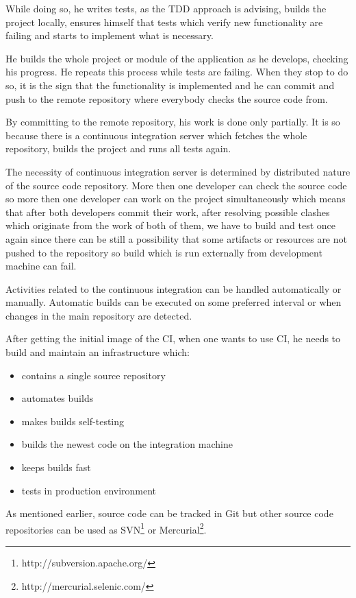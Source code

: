 \documentclass[12pt,final,oneside]{fithesis}
\begin{document}
While doing so, he writes tests, as the TDD approach is advising, builds the project locally, ensures himself that tests which verify new functionality are failing and starts to implement what is necessary.

He builds the whole project or module of the application as he develops, checking his progress. He repeats this process while tests are failing. When they stop to do so, it is the sign that the functionality is implemented and he can commit and push to the remote repository where everybody checks the source code from.

By committing to the remote repository, his work is done only partially. It is so because there is a continuous integration server which fetches the whole repository, builds the project and runs all tests again.

The necessity of continuous integration server is determined by distributed nature of the source code repository. More then one developer can check the source code so more then one developer can work on the project simultaneously which means that after both developers commit their work, after resolving possible clashes which originate from the work of both of them, we have to build and test once again since there can be still a possibility that some artifacts or resources are not pushed to the repository so build which is run externally from development machine can fail.

Activities related to the continuous integration can be handled automatically or manually. Automatic builds can be executed on some preferred interval or when changes in the main repository are detected.

After getting the initial image of the CI, when one wants to use CI, he needs to build and maintain an infrastructure which: \cite{bib012}

\begin{itemize}
	\item{contains a single source repository}
	\item{automates builds}
	\item{makes builds self-testing}
	\item{builds the newest code on the integration machine}
	\item{keeps builds fast}
	\item{tests in production environment}
\end{itemize}

As mentioned earlier, source code can be tracked in Git but other source code repositories can be used as SVN\footnote{http://subversion.apache.org/} or Mercurial\footnote{http://mercurial.selenic.com/}.
\end{document}
